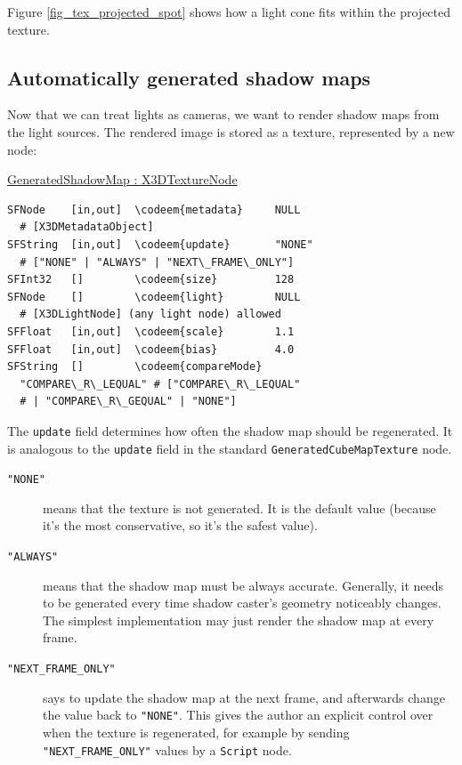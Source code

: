 \documentclass{acmsiggraph}                     %
\newenvironment{mycode}
{\begin{mycodecore}}
{\end{mycodecore}
\vspace{-0.1in}}
\newcommand*{\codeem}[1]{\textbf{#1}}
\begin{document}
Figure \ref{fig_tex_projected_spot} shows how a light cone fits within
the projected texture.

\vspace{-1in} %

\needspace{1in}
\subsection{Automatically generated shadow maps}

Now that we can treat lights as cameras, we want to render shadow maps
from the light sources. The rendered image is stored as a texture,
represented by a new node:

\begin{mycode}
\underline{GeneratedShadowMap : X3DTextureNode}
\begin{Verbatim}[commandchars=\\\{\}]
SFNode    [in,out]  \codeem{metadata}     NULL
  # [X3DMetadataObject]
SFString  [in,out]  \codeem{update}       "NONE"
  # ["NONE" | "ALWAYS" | "NEXT\_FRAME\_ONLY"]
SFInt32   []        \codeem{size}         128
SFNode    []        \codeem{light}        NULL
  # [X3DLightNode] (any light node) allowed
SFFloat   [in,out]  \codeem{scale}        1.1
SFFloat   [in,out]  \codeem{bias}         4.0
SFString  []        \codeem{compareMode}
  "COMPARE\_R\_LEQUAL" # ["COMPARE\_R\_LEQUAL"
  # | "COMPARE\_R\_GEQUAL" | "NONE"]
\end{Verbatim}
\end{mycode}

The \texttt{update} field determines how often the shadow map should be
regenerated. It is analogous to the \texttt{update} field in the standard
\texttt{GeneratedCubeMapTexture} node.

\begin{description}
  \item[\texttt{"NONE"}] means that the texture is not generated.
    It is the default value (because it's the most conservative,
    so it's the safest value).

  \item[\texttt{"ALWAYS"}] means that the shadow map must be always accurate.
    Generally, it needs to be generated every time shadow caster's geometry
    noticeably changes.
    The simplest implementation may just render the shadow map at every frame.

  \item[\texttt{"NEXT\_FRAME\_ONLY"}] says to update the shadow map
    at the next frame, and afterwards change the value back to \texttt{"NONE"}.
    This gives the author an explicit control over when the texture is
    regenerated, for example by sending \texttt{"NEXT\_FRAME\_ONLY"}
    values by a \texttt{Script} node.
\end{description}
\end{document}
